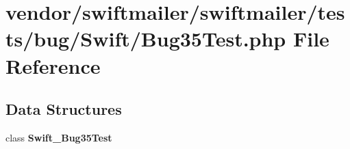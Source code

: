 \section{vendor/swiftmailer/swiftmailer/tests/bug/\+Swift/\+Bug35\+Test.php File Reference}
\label{_bug35_test_8php}
\subsection*{Data Structures}
\begin{DoxyCompactItemize}
\item 
class {\bf Swift\+\_\+\+Bug35\+Test}
\end{DoxyCompactItemize}
